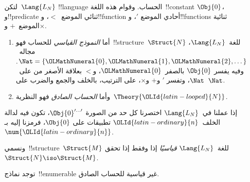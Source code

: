 \documentclass[../../../include/open-logic-section]{subfiles}
\begin{document}

\begin{defn}
لتكن~$\Lang{L_N}$ !!{language} الحساب. وقوام هذه اللغة~!!{constant}
$\Obj{0}$، و!!{predicate} ثنائي الموضع~$<$، و!!{function} أحادي الموضع
$\prime$، و!!{function}s ثنائية الموضع~$+$ و$\times$.
\begin{enumerate}
\item أما \emph{النموذج القياسي} للحساب فهو~!!{structure}~$\Struct{N}$
  للغة~$\Lang{L_N}$، مجاله~$\Nat = \{ \OLMathNumeral{0}, \OLMathNumeral{1}, \OLMathNumeral{2}, \dots\}$. وفيه يفسر
  $\Obj{0}$ بالصفر~$\OLMathNumeral{0}$، و$<$ بعلاقة الأصغر من على~$\Nat$، وتفسر
  $\prime$ و$+$ و$\times$، على الترتيب، بالخلف والجمع والضرب على~$\Nat$.
\item وأما \emph{الحساب الصادق} فهو النظرية~$\Theory{\OLId{latin-looped}{N}}$.
\end{enumerate}
\end{defn}

إذا عملنا في~$\Lang{L_N}$ اختصرنا كل حد من الصورة
$\Obj{0}^{\prime\dots\prime}$، تكون فيه لدالة الخلف~$\OLId{latin-ordinary}{n}$ تطبيقات على
$\Obj{0}$، فرمزنا إليه بـ~$\num{\OLId{latin-ordinary}{n}}$.

\begin{defn}
ونسمي~!!{structure}~$\Struct{M}$ للغة~$\Lang{L_N}$ \emph{قياسيًا} إذا
وفقط إذا تحقق~$\Struct{N} \iso \Struct{M}$.
\end{defn}

\begin{thm}
توجد نماذج~!!{enumerable} غير قياسية للحساب الصادق.
\end{thm}
\end{document}
